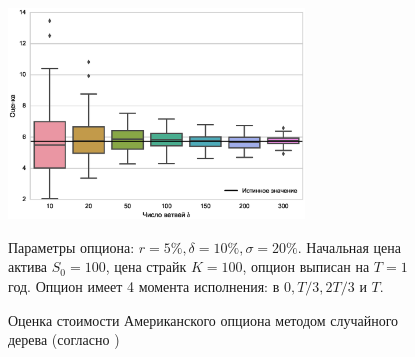 \documentclass[specialist,
               substylefile = ../spbu.rtx,
               subf,href,colorlinks=true, 10pt]{disser}
\begin{document}
\begin{figure}
\center\includegraphics[width=0.7\textwidth]{tree_plot.eps}
	\caption{Оценка стоимости Американского опциона методом случайного дерева (согласно \cite{Broadie1997})}\label{fig:tree}
	\footnotesize{Параметры опциона: $r = 5\%, \delta = 10\%, \sigma = 20\%$. Начальная цена актива $S_0 = 100$, цена страйк $K = 100$, опцион выписан на $T=1$ год. Опцион имеет 4 момента исполнения: в $0, T/3, 2T/3$ и $T$.}
\end{figure}







% 
% 


\printbibliography
\end{document}
